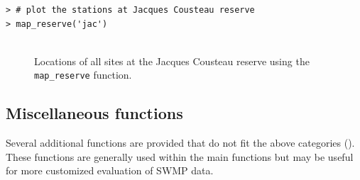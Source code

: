 \documentclass[10pt,letterpaper]{article}\usepackage[]{graphicx}\usepackage[]{color}
\makeatletter
\newenvironment{kframe}{%
 \def\at@end@of@kframe{}%
 \ifinner\ifhmode%
  \def\at@end@of@kframe{\end{minipage}}%
  \begin{minipage}{\columnwidth}%
 \fi\fi%
 \def\FrameCommand##1{\hskip\@totalleftmargin \hskip-\fboxsep
 \colorbox{shadecolor}{##1}\hskip-\fboxsep
     \hskip-\linewidth \hskip-\@totalleftmargin \hskip\columnwidth}%
 \MakeFramed {\advance\hsize-\width
   \@totalleftmargin\z@ \linewidth\hsize
   \@setminipage}}%
 {\par\unskip\endMakeFramed%
 \at@end@of@kframe}
\newenvironment{knitrout}{}{} %
\makeatother
\begin{document}
\begin{knitrout}\small
{}\color{fgcolor}\begin{kframe}
\begin{verbatim}
> # plot the stations at Jacques Cousteau reserve
> map_reserve('jac')
\end{verbatim}
\end{kframe}\begin{figure}[!h]

{\centering \includegraphics[width=0.00\textwidth]{figure/map_ex-1} 

}

\caption[Locations of all sites at the Jacques Cousteau reserve using the \texttt{map\_reserve} function]{Locations of all sites at the Jacques Cousteau reserve using the \texttt{map\_reserve} function.}\label{fig:map_ex}
\end{figure}


\end{knitrout}

\subsection*{Miscellaneous functions}

Several additional functions are provided that do not fit the above categories ().  These functions are generally used within the main functions but may be useful for more customized evaluation of \gls{SWMP} data.  
\end{document}
